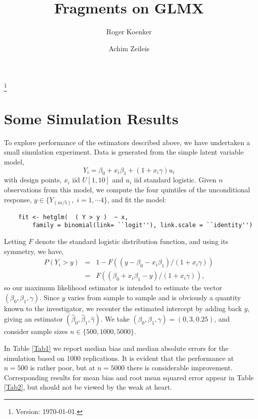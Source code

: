 \documentclass[12]{amsart}
\begin{document}


\title{Fragments on GLMX}

\thanks{Version: \today.}  

\author{Roger Koenker}
\author{Achim Zeileis}

\maketitle

\section{Some Simulation Results}
To explore performance of the estimators described above, we have undertaken a small
simulation experiment.  Data is generated from the simple latent variable model,
\[
Y_i = \beta_0 + x_i \beta_1 + (1 + x_i \gamma ) u_i
\]
with design points, $x_i$ iid $U[1,10]$ and $u_i$ iid standard logistic.  Given
$n$ observations from this model, we compute the four quintiles of the unconditional
response, $y \in \{ Y_{(in/5)}, \; i = 1, \cdots 4 \}$, and fit the model:
\begin{verbatim}
    fit <- hetglm(  ( Y > y )  ~ x, 
        family = binomial(link= ``logit''), link.scale = ``identity'')
\end{verbatim}
Letting $F$ denote the standard logistic distribution function, and using
its symmetry, we have,
\begin{eqnarray}
	P(Y_i > y) &=& 1 - F( ( y - \beta_0 - x_i \beta_1 )/(1 + x_i \gamma))\\
	&=& F( ( \beta_0 + x_i \beta_1 - y)/(1 + x_i \gamma)),
\end{eqnarray}
so our maximum likelihood estimator is intended to estimate the vector
$(\beta_0 , \beta_1 , \gamma)$.  Since $y$ varies from sample to sample
and is obviously a quantity known to the investigator, we recenter the
estimated intercept by adding back $y$, giving an estimator
$(\hat \beta_0 , \hat \beta_1 , \hat \gamma)$.  We take
$(\beta_0 , \beta_1 , \gamma) = (0, 3, 0.25)$, and consider sample sizes
$n \in \{ 500, 1000, 5000 \}$.

In Table \ref{Tab1} we report median bias and  median absolute errors for
the simulation based on 1000 replications.  It is evident that the performance
at $n = 500$ is rather poor, but at $n= 5000$ there is considerable improvement.
Corresponding results for mean bias and root mean squared error appear in
Table \ref{Tab2}, but should not be viewed by the weak at heart.



\end{document}
